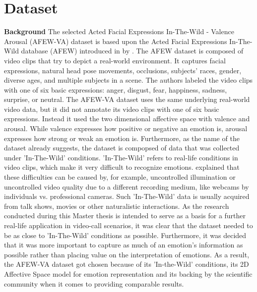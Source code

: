 \section{Dataset}
\textbf{Background}
\newline
The selected Acted Facial Expressions In-The-Wild - Valence Arousal (AFEW-VA) dataset \citet{Kossaifi:2017:AFEW-VADatabase} is based upon the Acted Facial Expressions In-The-Wild database (AFEW) introduced in \citeyear{Dhall:2012:AFEW} by \citet{Dhall:2012:AFEW}. The AFEW dataset is composed of video clips that try to depict a real-world environment. It captures facial expressions, natural head pose movements, occlusions, subjects' races, gender, diverse ages, and multiple subjects in a scene. The authors labeled the video clips with one of six basic expressions: anger, disgust, fear, happiness, sadness, surprise, or neutral.
\newline\newline
The AFEW-VA dataset \citep{Kossaifi:2017:AFEW-VADatabase} uses the same underlying real-world video data, but it did not annotate its video clips with one of six basic expressions. Instead it used the two dimensional affective space with valence and arousal. While valence expresses how positive or negative an emotion is, arousal expresses how strong or weak an emotion is.
\newline\newline
Furthermore, as the name of the dataset already suggests, the dataset is compopsed of data that was collected under 'In-The-Wild' conditions. 'In-The-Wild' refers to real-life conditions in video clips, which make it very difficult to recognize emotions. \citet{Salah:2018:VideoBasedER} explained that these difficulties can be caused by, for example, uncontrolled illumination or uncontrolled video quality due to a different recording medium, like webcams by individuals vs. professional cameras. Such 'In-The-Wild' data is usually acquired from talk shows, movies or other naturalistic interactions. 
\newline\newline
As the research conducted during this Master thesis is intended to serve as a basis for a further real-life application in video-call scenarios, it was clear that the dataset needed to be as close to 'In-The-Wild' conditions as possible. Furthermore, it was decided that it was more important to capture as much of an emotion's information as possible rather than placing value on the interpretation of emotions. As a result, the AFEW-VA dataset got chosen because of its 'In-the-Wild' conditions, its 2D Affective Space model for emotion representation and its backing by the scientific community when it comes to providing comparable results.
